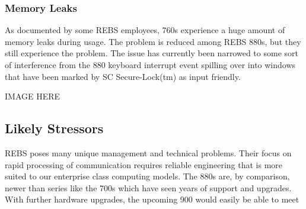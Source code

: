 \documentclass{article}
\begin{document}
\begin{multicols}{2}
\subsubsection{Memory Leaks}
As documented by some REBS employees, 760s experience a huge amount of memory leaks during usage. The problem is reduced among REBS 880s, but they still experience the problem. The issue has currently been narrowed to some sort of interference from the 880 keyboard interrupt event spilling over into windows that have been marked by SC Secure-Lock(tm) as input friendly.

IMAGE HERE

\subsection{Likely Stressors}
REBS poses many unique management and technical problems. Their focus on rapid processing of communication requires reliable engineering that is more suited to our enterprise class computing models. The 880s are, by comparison, newer than series like the 700s which have seen years of support and upgrades. With further hardware upgrades, the upcoming 900 would easily be able to meet 
\end{multicols}
\end{document}
